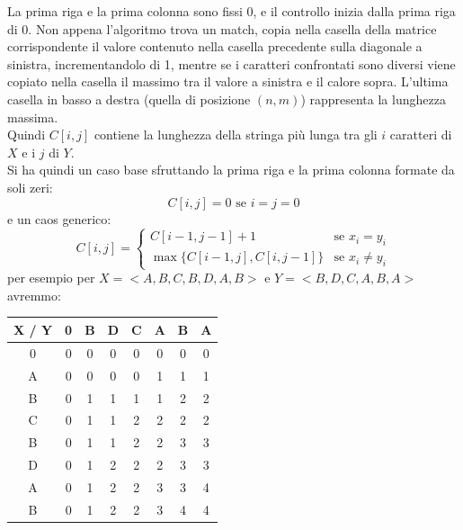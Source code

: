 \documentclass[a4paper,12pt, oneside]{book}
\begin{document}
La prima riga e la prima colonna sono fissi 0, e il controllo inizia
dalla prima riga di 0. Non appena l’algoritmo trova un match, copia
nella casella della matrice corrispondente il valore contenuto nella
casella precedente sulla diagonale a sinistra, incrementandolo di 1,
mentre se i caratteri confrontati sono diversi viene copiato nella
casella il massimo tra il valore a sinistra e il calore
sopra. L'ultima casella in basso a destra (quella di posizione
$(n,m)$) rappresenta la lunghezza massima.\\
Quindi $C[i,j]$ contiene la lunghezza della stringa più lunga tra gli
$i$ caratteri di $X$ e i $j$ di $Y$.\\
Si ha quindi un caso base sfruttando la prima riga e la prima colonna
formate da soli zeri:
\[C[i,j]=0 \mbox{ se } i=j=0\]
e un caos generico:
\[C[i,j]=
  \begin{cases}
    C[i-1, j-1]+1 & \mbox{se } x_i=y_i\\
    \max \{C[i-1, j], C[i, j-1]\} & \mbox{se } x_i\neq y_i
  \end{cases}
\]
per esempio per $X=<A,B,C,B,D,A,B>$ e $Y=<B,D,C,A,B,A>$ avremmo:
\begin{center}
  \begin{tabular}{|c|c|c|c|c|c|c|c|}
    \hline
    X / Y & {0} & {B} & {D} & {C} & {A} & {B} & {A} \\
    \hline
    0 & {0} & {0} & {0} & {0} & {0} & {0} & {0} \\
    \hline
    A & {0} & {0} & {0} & {0} & {1} & {1} & {1} \\
    \hline
    B & {0} & {1} & {1} & {1} & {1} & {2} & {2} \\
    \hline
    C & {0} & {1} & {1} & {2} & {2} & {2} & {2} \\
    \hline
    B & {0} & {1} & {1} & {2} & {2} & {3} & {3} \\
    \hline
    D & {0} & {1} & {2} & {2} & {2} & {3} & {3} \\
    \hline
    A & {0} & {1} & {2} & {2} & {3} & {3} & {4} \\
    \hline
    B & {0} & {1} & {2} & {2} & {3} & {4} & {4} \\
    \hline
  \end{tabular}
\end{center}
\end{document}
